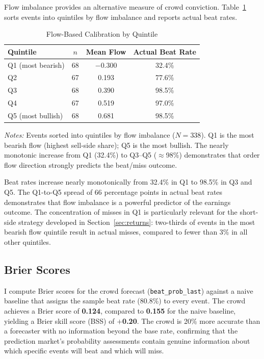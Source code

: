 \documentclass[11pt]{article}
\begin{document}
Flow imbalance provides an alternative measure of crowd conviction. Table~\ref{tab:flow_calibration} sorts events into quintiles by flow imbalance and reports actual beat rates.

\begin{table}[htbp]
\centering
\begin{threeparttable}
\caption{Flow-Based Calibration by Quintile}
\label{tab:flow_calibration}
\begin{tabular}{lccc}
\toprule
Quintile & $n$ & Mean Flow & Actual Beat Rate \\
\midrule
Q1 (most bearish) & 68 & $-$0.300 & 32.4\% \\
Q2 & 67 & 0.193 & 77.6\% \\
Q3 & 68 & 0.390 & 98.5\% \\
Q4 & 67 & 0.519 & 97.0\% \\
Q5 (most bullish) & 68 & 0.681 & 98.5\% \\
\bottomrule
\end{tabular}
\begin{tablenotes}
\small
\item \textit{Notes:} Events sorted into quintiles by flow imbalance ($N = 338$). Q1 is the most bearish flow (highest sell-side share); Q5 is the most bullish. The nearly monotonic increase from Q1 (32.4\%) to Q3--Q5 ($\approx$98\%) demonstrates that order flow direction strongly predicts the beat/miss outcome.
\end{tablenotes}
\end{threeparttable}
\end{table}

Beat rates increase nearly monotonically from 32.4\% in Q1 to 98.5\% in Q3 and Q5. The Q1-to-Q5 spread of 66 percentage points in actual beat rates demonstrates that flow imbalance is a powerful predictor of the earnings outcome. The concentration of misses in Q1 is particularly relevant for the short-side strategy developed in Section~\ref{sec:returns}: two-thirds of events in the most bearish flow quintile result in actual misses, compared to fewer than 3\% in all other quintiles.

\subsection{Brier Scores}

I compute Brier scores for the crowd forecast (\texttt{beat\_prob\_last}) against a naive baseline that assigns the sample beat rate (80.8\%) to every event. The crowd achieves a Brier score of \textbf{0.124}, compared to \textbf{0.155} for the naive baseline, yielding a Brier skill score (BSS) of $+$\textbf{0.20}. The crowd is 20\% more accurate than a forecaster with no information beyond the base rate, confirming that the prediction market's probability assessments contain genuine information about which specific events will beat and which will miss.
\end{document}
